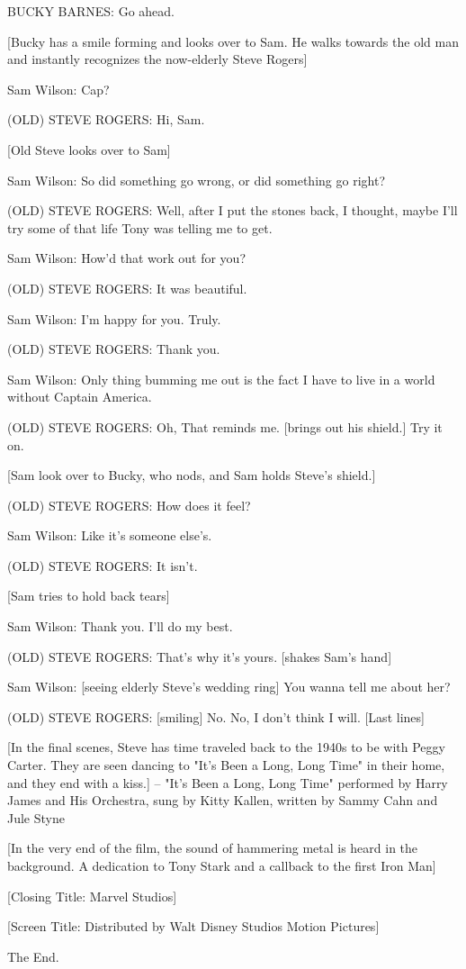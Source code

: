 BUCKY BARNES: Go ahead.

[Bucky has a smile forming and looks over to Sam. He walks towards the old man and instantly recognizes the now-elderly Steve Rogers]

Sam Wilson: Cap?

(OLD) STEVE ROGERS: Hi, Sam.

[Old Steve looks over to Sam]

Sam Wilson: So did something go wrong, or did something go right?

(OLD) STEVE ROGERS: Well, after I put the stones back, I thought, maybe I'll try some of that life Tony was telling me to get.

Sam Wilson: How'd that work out for you?

(OLD) STEVE ROGERS: It was beautiful.

Sam Wilson: I'm happy for you. Truly.

(OLD) STEVE ROGERS: Thank you.

Sam Wilson: Only thing bumming me out is the fact I have to live in a world without Captain America.

(OLD) STEVE ROGERS: Oh, That reminds me. [brings out his shield.] Try it on.

[Sam look over to Bucky, who nods, and Sam holds Steve's shield.]

(OLD) STEVE ROGERS: How does it feel?

Sam Wilson: Like it's someone else's.

(OLD) STEVE ROGERS: It isn't.

[Sam tries to hold back tears]

Sam Wilson: Thank you. I'll do my best.

(OLD) STEVE ROGERS: That's why it's yours. [shakes Sam's hand]

Sam Wilson: [seeing elderly Steve's wedding ring] You wanna tell me about her?

(OLD) STEVE ROGERS: [smiling] No. No, I don't think I will. [Last lines]

[In the final scenes, Steve has time traveled back to the 1940s to be with Peggy Carter. They are seen dancing to "It's Been a Long, Long Time" in their home, and they end with a kiss.] – "It's Been a Long, Long Time" performed by Harry James and His Orchestra, sung by Kitty Kallen, written by Sammy Cahn and Jule Styne

[In the very end of the film, the sound of hammering metal is heard in the background. A dedication to Tony Stark and a callback to the first Iron Man]

[Closing Title: Marvel Studios]

[Screen Title: Distributed by Walt Disney Studios Motion Pictures]

The End.
